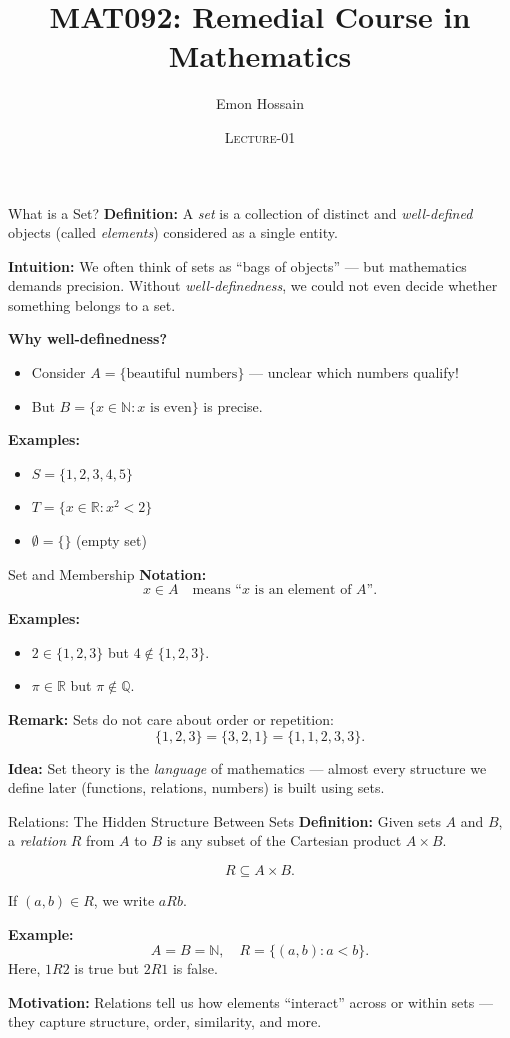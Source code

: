 \documentclass[11pt]{beamer}
\author[] %
{Emon Hossain\inst{1}}
\institute[University of Dhaka] %
{
  \inst{1}%
  Lecturer\\MNS department\\Brac University
}
\date[] %
{\textsc{Lecture-01}}
\title[]{MAT092: Remedial Course in Mathematics}
\theoremstyle{plain}
\begin{document}
\begin{frame}
\titlepage
\end{frame}

\begin{frame}{What is a Set?}
\textbf{Definition:}  
A \emph{set} is a collection of distinct and \emph{well-defined} objects (called \emph{elements}) considered as a single entity.

\medskip
\textbf{Intuition:}  
We often think of sets as “bags of objects” — but mathematics demands precision.  
Without \emph{well-definedness}, we could not even decide whether something belongs to a set.

\medskip
\textbf{Why well-definedness?}  
\begin{itemize}
    \item Consider $A = \{\text{beautiful numbers}\}$ — unclear which numbers qualify!  
    \item But $B = \{x \in \mathbb{N} : x \text{ is even}\}$ is precise.
\end{itemize}

\medskip
\textbf{Examples:}
\begin{itemize}
    \item $S = \{1, 2, 3, 4, 5\}$  
    \item $T = \{x \in \mathbb{R} : x^2 < 2\}$  
    \item $\emptyset = \{\}$ (empty set)
\end{itemize}
\end{frame}

\begin{frame}{Set and Membership}
\textbf{Notation:}
\[
x \in A \quad \text{means “$x$ is an element of $A$”}.
\]

\textbf{Examples:}
\begin{itemize}
    \item $2 \in \{1,2,3\}$ but $4 \notin \{1,2,3\}$.
    \item $\pi \in \mathbb{R}$ but $\pi \notin \mathbb{Q}$.
\end{itemize}

\textbf{Remark:}
Sets do not care about order or repetition:
\[
\{1,2,3\} = \{3,2,1\} = \{1,1,2,3,3\}.
\]

\textbf{Idea:}  
Set theory is the \emph{language} of mathematics — almost every structure we define later (functions, relations, numbers) is built using sets.
\end{frame}

\begin{frame}{Relations: The Hidden Structure Between Sets}
\textbf{Definition:}  
Given sets $A$ and $B$, a \emph{relation} $R$ from $A$ to $B$ is any subset of the Cartesian product $A \times B$.

\[
R \subseteq A \times B.
\]

If $(a,b) \in R$, we write $aRb$.

\medskip
\textbf{Example:}
\[
A = B = \mathbb{N}, \quad R = \{(a,b): a < b\}.
\]
Here, $1R2$ is true but $2R1$ is false.

\medskip
\textbf{Motivation:}  
Relations tell us how elements “interact” across or within sets — they capture structure, order, similarity, and more.
\end{frame}
\end{document}
